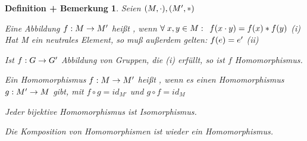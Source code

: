 \documentclass[a4paper,10pt,german]{scrbook}
\theoremstyle{saetze}
\theoremstyle{definitionen}
\newtheorem{DefBem}[Def]{Definition + Bemerkung}
\begin{document}
\begin{DefBem}
    Seien $(M, \cdot), (M',*)$ \bla
    \begin{enum}
        \item Eine Abbildung $f:M\rightarrow M'$ heißt , wenn
        $\forall \; x,y \in M:\\\\$ \bigskip $ f(x\cdot y) = f(x)*f(y)$ \hfill
        \textmd{(i)} \newline Hat M ein neutrales Element, so muß außerdem
        gelten: $\\\\f(e) = e'$ \hfill \textmd{(ii)}
        
        \item Ist $f:G \rightarrow G'$ Abbildung von Gruppen, die \textmd{(i)} erfüllt,
        so ist $f$ Homomorphismus.
        
        \item Ein Homomorphismus $f:M \rightarrow M'$ heißt , wenn es
        einen Homomorphismus $g:M'\rightarrow M$ gibt, mit $f \circ g = id_{M'}$ und $g
        \circ f = id_M$

        \item Jeder bijektive Homomorphismus ist Isomorphismus. \newline

        \item Die Komposition von Homomorphismen ist wieder ein Homomorphismus.
    \end{enum}
\end{DefBem}
\end{document}
